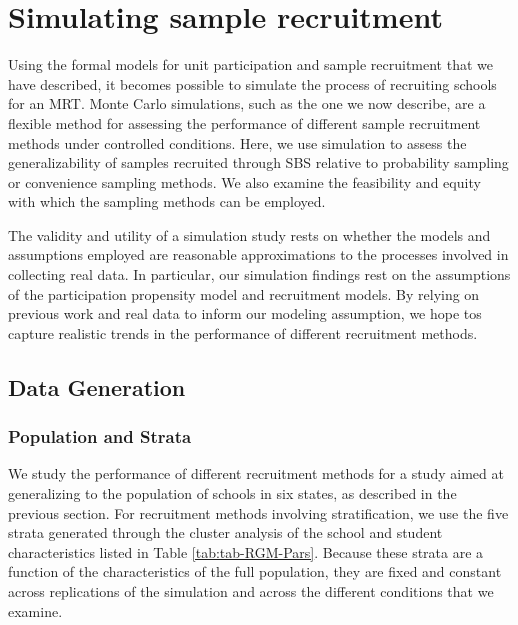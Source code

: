 \documentclass[
  english,
  man,floatsintext]{apa6}
\begin{document}
\hypertarget{simulating-sample-recruitment}{%
\section{Simulating sample recruitment}\label{simulating-sample-recruitment}}

Using the formal models for unit participation and sample recruitment that we have described, it becomes possible to simulate the process of recruiting schools for an MRT.
Monte Carlo simulations, such as the one we now describe, are a flexible method for assessing the performance of different sample recruitment methods under controlled conditions.
Here, we use simulation to assess the generalizability of samples recruited through SBS relative to probability sampling or convenience sampling methods. We also examine the feasibility and equity with which the sampling methods can be employed.

The validity and utility of a simulation study rests on whether the models and assumptions employed are reasonable approximations to the processes involved in collecting real data. In particular, our simulation findings rest on the assumptions of the participation propensity model and recruitment models. By relying on previous work and real data to inform our modeling assumption, we hope tos capture realistic trends in the performance of different recruitment methods.

\hypertarget{data-generation}{%
\subsection{Data Generation}\label{data-generation}}

\hypertarget{population-and-strata}{%
\subsubsection{Population and Strata}\label{population-and-strata}}

We study the performance of different recruitment methods for a study aimed at generalizing to the population of schools in six states, as described in the previous section. For recruitment methods involving stratification, we use the five strata generated through the cluster analysis of the school and student characteristics listed in Table \ref{tab:tab-RGM-Pars}.
Because these strata are a function of the characteristics of the full population, they are fixed and constant across replications of the simulation and across the different conditions that we examine.
\end{document}
